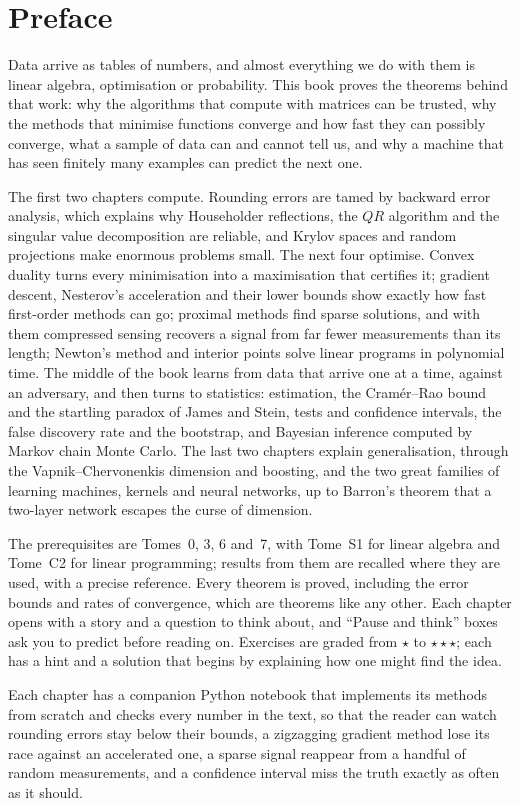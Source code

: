 \chapter*{Preface}

Data arrive as tables of numbers, and almost everything we do with them is linear algebra, optimisation or
probability. This book proves the theorems behind that work: why the algorithms that compute with matrices can be
trusted, why the methods that minimise functions converge and how fast they can possibly converge, what a sample of
data can and cannot tell us, and why a machine that has seen finitely many examples can predict the next one.

The first two chapters compute. Rounding errors are tamed by backward error analysis, which explains why Householder
reflections, the $QR$ algorithm and the singular value decomposition are reliable, and Krylov spaces and random
projections make enormous problems small. The next four optimise. Convex duality turns every minimisation into a
maximisation that certifies it; gradient descent, Nesterov's acceleration and their lower bounds show exactly how fast
first-order methods can go; proximal methods find sparse solutions, and with them compressed sensing recovers a signal
from far fewer measurements than its length; Newton's method and interior points solve linear programs in polynomial
time. The middle of the book learns from data that arrive one at a time, against an adversary, and then turns to
statistics: estimation, the Cram\'er--Rao bound and the startling paradox of James and Stein, tests and confidence
intervals, the false discovery rate and the bootstrap, and Bayesian inference computed by Markov chain Monte Carlo.
The last two chapters explain generalisation, through the Vapnik--Chervonenkis dimension and boosting, and the two great
families of learning machines, kernels and neural networks, up to Barron's theorem that a two-layer network escapes the
curse of dimension.

The prerequisites are Tomes~0, 3, 6 and~7, with Tome~S1 for linear algebra and Tome~C2 for linear programming; results
from them are recalled where they are used, with a precise reference. Every theorem is proved, including the error
bounds and rates of convergence, which are theorems like any other. Each chapter opens with a story and a question to
think about, and ``Pause and think'' boxes ask you to predict before reading on. Exercises are graded from $\star$ to
$\star\star\star$; each has a hint and a solution that begins by explaining how one might find the idea.

Each chapter has a companion Python notebook that implements its methods from scratch and checks every number in the
text, so that the reader can watch rounding errors stay below their bounds, a zigzagging gradient method lose its race
against an accelerated one, a sparse signal reappear from a handful of random measurements, and a confidence interval
miss the truth exactly as often as it should.
